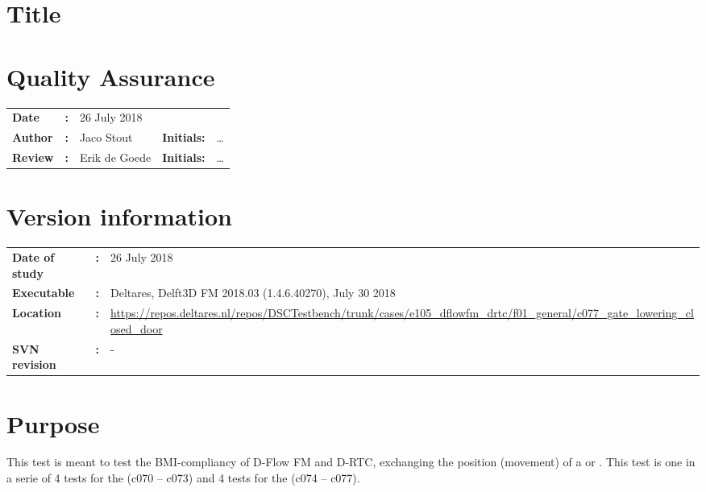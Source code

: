 \section{Title}
\newrefsegment

\section*{Quality Assurance}
\begin{tabular}{@{}p{27mm}@{}p{0mm}p{\textwidth-52mm-48pt}p{15mm}p{10mm}}
\textbf{Date} & \textbf{:} &  26 July 2018 \\ 
\textbf{Author} & \textbf{:} &  Jaco Stout & \textbf{Initials:} & \ldots \\
\textbf{Review} & \textbf{:} &  Erik de Goede & \textbf{Initials:} & \ldots 
\end{tabular}

\section*{Version information}
\begin{tabular}{@{}p{23mm}@{}p{0mm}p{\textwidth-23mm-30pt}}
\textbf{Date of study}& \textbf{:} & 26 July 2018 \\
\textbf{Executable}   & \textbf{:} & Deltares, Delft3D FM 2018.03 (1.4.6.40270), July 30 2018 \\
\textbf{Location}     & \textbf{:} & \url{https://repos.deltares.nl/repos/DSCTestbench/trunk/cases/e105_dflowfm_drtc/f01_general/c077_gate_lowering_closed_door} \\ 
\textbf{SVN revision} & \textbf{:} & -
\end{tabular}

\section*{Purpose}

This test is meant to test the BMI-compliancy of D-Flow FM and D-RTC, exchanging the position (movement) of a  or . This test is one in a serie of 4 tests for the  (c070 -- c073) and 4 tests for the  (c074 -- c077).

